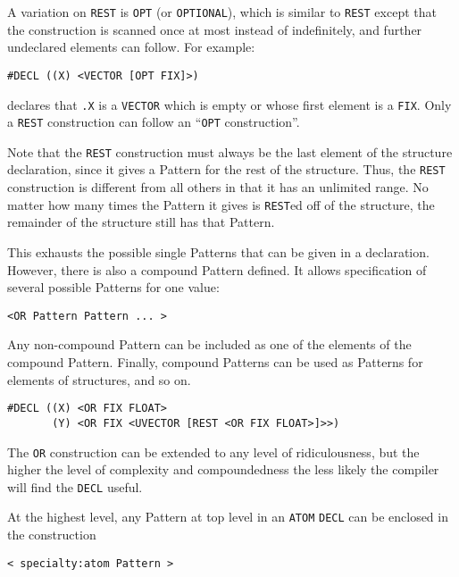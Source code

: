 \documentclass[a4paper,]{article}
\begin{document}
A variation on \texttt{REST} is \texttt{OPT}  (or
\texttt{OPTIONAL}), which is similar to \texttt{REST} except that the construction is
scanned once at most instead of indefinitely, and further undeclared elements can follow. For example:

\begin{verbatim}
#DECL ((X) <VECTOR [OPT FIX]>)
\end{verbatim}

declares that \texttt{.X} is a \texttt{VECTOR} which is empty or whose first element is a \texttt{FIX}. Only a
\texttt{REST} construction can follow an ``\texttt{OPT} construction''.

Note that the \texttt{REST} construction must always be the last element of the structure declaration, since it gives a
Pattern for the rest of the structure. Thus, the \texttt{REST} construction is different from all others in that it has an
unlimited range. No matter how many times the Pattern it gives is \texttt{REST}ed off of the structure, the remainder of
the structure still has that Pattern.

This exhausts the possible single Patterns that can be given in a declaration. However, there is also a compound Pattern
defined. It allows specification of several possible Patterns for one value:

\begin{verbatim}
<OR Pattern Pattern ... >
\end{verbatim}

Any non-compound Pattern can be included as one of the elements of the compound Pattern. Finally, compound Patterns can be
used as Patterns for elements of structures, and so on.

\begin{verbatim}
#DECL ((X) <OR FIX FLOAT>
       (Y) <OR FIX <UVECTOR [REST <OR FIX FLOAT>]>>)
\end{verbatim}

The \texttt{OR} construction can be extended to any level of ridiculousness, but the higher the level of complexity and
compoundedness the less likely the compiler will find the \texttt{DECL} useful.

At the highest level, any Pattern at top level in an \texttt{ATOM} \texttt{DECL} can be enclosed in the construction

\begin{verbatim}
< specialty:atom Pattern >
\end{verbatim}
\end{document}
